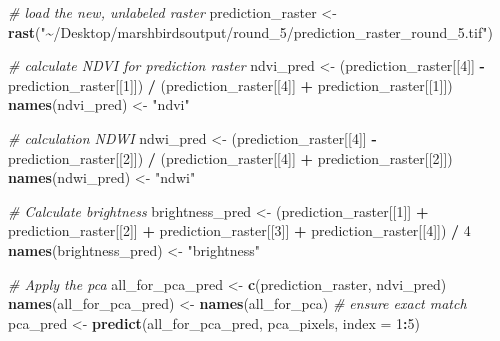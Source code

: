 \documentclass[
]{article}
\newenvironment{Shaded}{\begin{snugshade}}{\end{snugshade}}
\newcommand{\AttributeTok}[1]{\textcolor[rgb]{0.13,0.29,0.53}{#1}}
\newcommand{\CommentTok}[1]{\textcolor[rgb]{0.56,0.35,0.01}{\textit{#1}}}
\newcommand{\DecValTok}[1]{\textcolor[rgb]{0.00,0.00,0.81}{#1}}
\newcommand{\FunctionTok}[1]{\textcolor[rgb]{0.13,0.29,0.53}{\textbf{#1}}}
\newcommand{\NormalTok}[1]{#1}
\newcommand{\OtherTok}[1]{\textcolor[rgb]{0.56,0.35,0.01}{#1}}
\newcommand{\SpecialCharTok}[1]{\textcolor[rgb]{0.81,0.36,0.00}{\textbf{#1}}}
\newcommand{\StringTok}[1]{\textcolor[rgb]{0.31,0.60,0.02}{#1}}
\begin{document}
\begin{Shaded}
\begin{Highlighting}[]
\CommentTok{\# load the new, unlabeled raster}
\NormalTok{prediction\_raster }\OtherTok{\textless{}{-}} \FunctionTok{rast}\NormalTok{(}\StringTok{"\textasciitilde{}/Desktop/marshbirdsoutput/round\_5/prediction\_raster\_round\_5.tif"}\NormalTok{)}

\CommentTok{\# calculate NDVI for prediction raster}
\NormalTok{ndvi\_pred }\OtherTok{\textless{}{-}}\NormalTok{ (prediction\_raster[[}\DecValTok{4}\NormalTok{]] }\SpecialCharTok{{-}}\NormalTok{ prediction\_raster[[}\DecValTok{1}\NormalTok{]]) }\SpecialCharTok{/} 
\NormalTok{  (prediction\_raster[[}\DecValTok{4}\NormalTok{]] }\SpecialCharTok{+}\NormalTok{ prediction\_raster[[}\DecValTok{1}\NormalTok{]])}
\FunctionTok{names}\NormalTok{(ndvi\_pred) }\OtherTok{\textless{}{-}} \StringTok{"ndvi"}

\CommentTok{\# calculation NDWI}
\NormalTok{ndwi\_pred }\OtherTok{\textless{}{-}}\NormalTok{ (prediction\_raster[[}\DecValTok{4}\NormalTok{]] }\SpecialCharTok{{-}}\NormalTok{ prediction\_raster[[}\DecValTok{2}\NormalTok{]]) }\SpecialCharTok{/} 
\NormalTok{  (prediction\_raster[[}\DecValTok{4}\NormalTok{]] }\SpecialCharTok{+}\NormalTok{ prediction\_raster[[}\DecValTok{2}\NormalTok{]])}
\FunctionTok{names}\NormalTok{(ndwi\_pred) }\OtherTok{\textless{}{-}} \StringTok{"ndwi"}

\CommentTok{\# Calculate brightness}
\NormalTok{brightness\_pred }\OtherTok{\textless{}{-}}\NormalTok{ (prediction\_raster[[}\DecValTok{1}\NormalTok{]] }\SpecialCharTok{+}\NormalTok{ prediction\_raster[[}\DecValTok{2}\NormalTok{]] }\SpecialCharTok{+} 
\NormalTok{                      prediction\_raster[[}\DecValTok{3}\NormalTok{]] }\SpecialCharTok{+}\NormalTok{ prediction\_raster[[}\DecValTok{4}\NormalTok{]]) }\SpecialCharTok{/} \DecValTok{4}
\FunctionTok{names}\NormalTok{(brightness\_pred) }\OtherTok{\textless{}{-}} \StringTok{"brightness"}

\CommentTok{\# Apply the pca}
\NormalTok{all\_for\_pca\_pred }\OtherTok{\textless{}{-}} \FunctionTok{c}\NormalTok{(prediction\_raster, ndvi\_pred)}
\FunctionTok{names}\NormalTok{(all\_for\_pca\_pred) }\OtherTok{\textless{}{-}} \FunctionTok{names}\NormalTok{(all\_for\_pca)  }\CommentTok{\# ensure exact match}
\NormalTok{pca\_pred }\OtherTok{\textless{}{-}} \FunctionTok{predict}\NormalTok{(all\_for\_pca\_pred, pca\_pixels, }\AttributeTok{index =} \DecValTok{1}\SpecialCharTok{:}\DecValTok{5}\NormalTok{)}
\end{Highlighting}
\end{Shaded}
\end{document}
